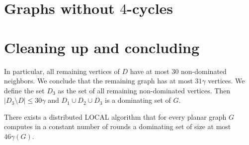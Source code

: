 \documentclass[a4paper,UKenglish,cleveref, autoref, thm-restate]{lipics-v2021}
\begin{document}
%
%
%
%
%
%
%

\section{Graphs without $4$-cycles}


\section{Cleaning up and concluding}

In particular, all remaining vertices of $D$ have at most $30$ non-dominated
neighbors. We conclude that the remaining graph has at most $31\gamma$
vertices. We define the set $D_3$ as the set of all remaining non-dominated
vertices. Then $|D_3\setminus D|\leq 30\gamma$ and $D_1\cup D_2\cup D_3$
is a dominating set of $G$.

\begin{theorem}
There exists a distributed LOCAL algorithm that for every planar graph
$G$ computes in a constant number of rounds a dominating set
of size at most $46\gamma(G)$.
\end{theorem}





\appendix
\end{document}
